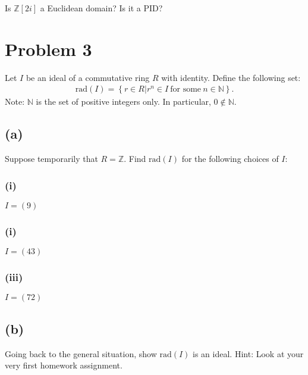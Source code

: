 \documentclass[10pt]{armath}
\newcommand{\Z}{\mathbb{Z}}
\newcommand{\N}{\mathbb{N}}
\newcommand{\zi}{\mathbb{Z}\left[2i\right]}
\newcommand{\rad}[1]{\text{rad}\left(#1\right)}
\begin{document}
Is $\zi$ a Euclidean domain? Is it a PID?

\section*{Problem 3}%
\label{sec:problem_3}

Let $I$ be an ideal of a commutative ring $R$ with identity. Define the
following set:
\begin{align*}
  \rad{I}=\left\{r\in R|r^n\in I\ \text{for some}\ n\in\N\right\}.
\end{align*}
Note: $\N$ is the set of positive integers only. In particular, $0 \notin \N$.

\subsection*{(a)}%
\label{sub:_a3_}

Suppose temporarily that $R=\Z$. Find $\rad{I}$ for the following choices of
$I$:

\subsubsection*{(i)}%
\label{ssub:_i_}

$I=(9)$

\subsubsection*{(i)}%
\label{ssub:_i_}

$I=(43)$

\subsubsection*{(iii)}%
\label{ssub:_i_}

$I=(72)$

\subsection*{(b)}%
\label{sub:_b3_}

Going back to the general situation, show $\rad{I}$ is an ideal. Hint: Look at
your very first homework assignment.
\end{document}
